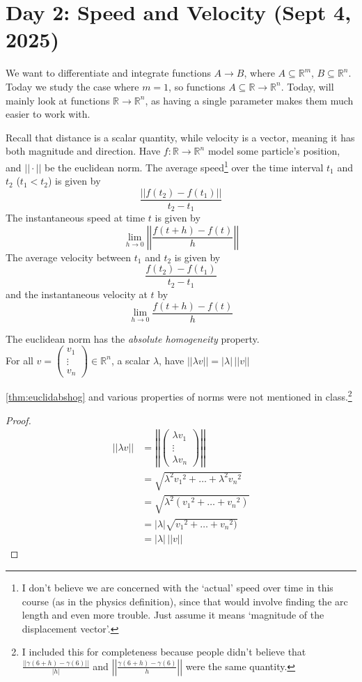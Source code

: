 \section{Day 2: Speed and Velocity (Sept 4, 2025)}

We want to differentiate and integrate functions $A \to B$, where $A \subseteq \mathbb{R}^m$, $B \subseteq \mathbb{R}^n$. Today we study the case where $m = 1$, so functions $A \subseteq \mathbb{R} \to \mathbb{R}^n$. Today, will mainly look at functions $\mathbb{R} \to \mathbb{R}^n$, as having a single parameter makes them much easier to work with.

Recall that distance is a scalar quantity, while velocity is a vector, meaning it has both magnitude and direction. Have $f: \mathbb{R} \to \mathbb{R}^n$ model some particle's position, and $||\cdot||$ be the euclidean norm. The average speed\footnote{I don't believe we are concerned with the `actual' speed over time in this course (as in the physics definition), since that would involve finding the arc length and even more trouble. Just assume it means `magnitude of the displacement vector'.} over the time interval $t_1$ and $t_2$ ($t_1 < t_2$) is given by
\[
\frac{||f(t_2) - f(t_1)||}{t_2-t_1}
\]
The instantaneous speed at time $t$ is given by
\[
\lim_{ h \to 0 } \left|\left|\frac{f(t + h) - f(t)}{h} \right|\right|
\]
The average velocity between $t_1$ and $t_2$ is given by
\[
\frac{f(t_2) - f(t_1)}{t_2 - t_1}
\]
and the instantaneous velocity at $t$ by
\[
\lim_{ h \to 0 } \frac{f(t + h) - f(t)}{h}
\]
\begin{simplethm} \label{thm:euclidabshog}
The euclidean norm has the \textit{absolute homogeneity} property. \\
    For all $v = \begin{pmatrix}
v_1 \\ \vdots \\ v_n
\end{pmatrix} \in \mathbb{R}^n$, a scalar $\lambda$, have $|| \lambda v || = |\lambda| \, ||v||$
\end{simplethm}
\ref{thm:euclidabshog} and various properties of norms were not mentioned in class.\footnote{I included this for completeness because people didn't believe that $\frac{||\gamma(6 + h) - \gamma(6)||}{|h|}$ and $\left|\left| \frac{\gamma(6 + h) - \gamma(6)}{h} \right|\right|$ were the same quantity.}
\begin{proof}

\begin{align*}
    ||\lambda v|| &= \left|\left|\begin{pmatrix}
\lambda v_1 \\ \vdots \\ \lambda v_n
\end{pmatrix} \right|\right| \\
    &= \sqrt{\lambda^2 {v_1}^2 + \dots + \lambda^2 {v_n}^2} \\
    &= \sqrt{\lambda^2 ({v_1}^2 + \dots + {v_n}^2)} \\
    &= |\lambda| \sqrt{{v_1}^2 + \dots + {v_n}^2)} \\
    &= |\lambda| \, ||v||
\end{align*}

\end{proof}
